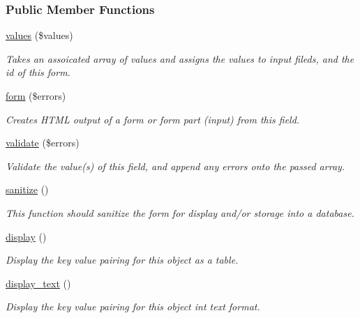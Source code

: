 \subsubsection*{Public Member Functions}
\begin{DoxyCompactItemize}
\item 
\hyperlink{interfacefield_a54958a09bc0dcd947d611b14741c5996}{values} (\$values)
\begin{DoxyCompactList}\small\item\em Takes an assoicated array of values and assigns the values to input fileds, and the id of this form. \end{DoxyCompactList}\item 
\hyperlink{interfacefield_a1b51c4b8b01f77a26eda359e1fc0fb4c}{form} (\$errors)
\begin{DoxyCompactList}\small\item\em Creates H\-T\-M\-L output of a form or form part (input) from this field. \end{DoxyCompactList}\item 
\hyperlink{interfacefield_a352b92f9e8dce69191bad79bdc5d972b}{validate} (\$errors)
\begin{DoxyCompactList}\small\item\em Validate the value(s) of this field, and append any errors onto the passed array. \end{DoxyCompactList}\item 
\hyperlink{interfacefield_a3ed132df10731b5ebe33acc44ac03c85}{sanitize} ()
\begin{DoxyCompactList}\small\item\em This function should sanitize the form for display and/or storage into a database. \end{DoxyCompactList}\item 
\hyperlink{interfacefield_a6a8bbd656a0e7cab2604f6df859bb60a}{display} ()
\begin{DoxyCompactList}\small\item\em Display the key value pairing for this object as a table. \end{DoxyCompactList}\item 
\hyperlink{interfacefield_a5e8d3e49ab5fba3956b7a297535806dc}{display\-\_\-text} ()
\begin{DoxyCompactList}\small\item\em Display the key value pairing for this object int text format. \end{DoxyCompactList}\end{DoxyCompactItemize}


